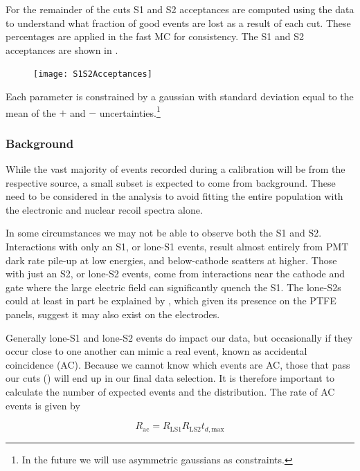 For the remainder of the cuts S1 and S2 acceptances are computed using the data to understand what fraction of good events are lost
as a result of each cut.  These percentages are applied in the fast MC for consistency.  The S1 and S2 acceptances are shown in
.

\begin{figure}
\centering
\texttt{[image: S1S2Acceptances]}
\label{fig:er_nr_calibrations_parameter_determ_cuts_acceptances}
\end{figure}

Each parameter is
constrained by a gaussian with standard deviation equal to the mean of the $+$ and $-$ uncertainties.\footnote{In the future we will use
asymmetric gaussians as constraints.}



\subsubsection{Background}
\label{subsubsec:er_nr_calibrations_parameter_determ_additional_components}
While the vast majority of events recorded during a calibration will be from the respective source, a small subset is expected to come
from background.  These need to be considered in the analysis to avoid fitting the entire population with the electronic and nuclear
recoil spectra alone.

In some circumstances we may not be able to observe both the S1 and S2.  Interactions with only an S1, or lone-S1 events, result almost
entirely from PMT dark rate pile-up at low energies, and below-cathode scatters at higher.  Those with just an S2, or lone-S2 events,
come from interactions near the cathode and gate where the large electric field can significantly quench the S1.  The lone-S2s
could at least in part be explained by , which given its presence on the PTFE panels, suggest it may also exist on the
electrodes.

Generally lone-S1 and lone-S2 events do impact our data, but occasionally if they occur close to one another can mimic a real event, known
as accidental coincidence (AC).  Because we cannot know which events are AC, those that pass our cuts 
() will end up in our final data
selection.  It is therefore important to calculate the number of expected events and the distribution.  The rate of AC events is given by

\begin{equation}
R_{\mathrm{ac}} = R_{\mathrm{LS1}} R_{\mathrm{LS2}} t_{d, \mathrm{max}}
\label{eq:er_nr_calibrations_parameter_determ_additional_components_accidental_coincidence}
\end{equation}

